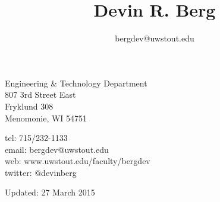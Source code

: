 \documentclass[10pt]{article}
\title{\bfseries\Huge Devin R. Berg}
\author{bergdev@uwstout.edu}
\date{}
\begin{document}
\maketitle
\vspace{1em}
\begin{minipage}[ht]{0.48\textwidth}
Engineering \& Technology Department\\
807 3rd Street East\\
Fryklund 308\\
Menomonie, WI 54751
\end{minipage}
\begin{minipage}[ht]{0.48\textwidth}
\begin{flushright}
tel: 715/232-1133\\
email: bergdev@uwstout.edu\\
web: www.uwstout.edu/faculty/bergdev\\
twitter: @devinberg
\end{flushright}
\end{minipage}
\vspace{20pt}


































\vspace{20pt}
\vspace{20pt}
\scriptsize\hfill Updated: 27 March 2015
\end{document}
